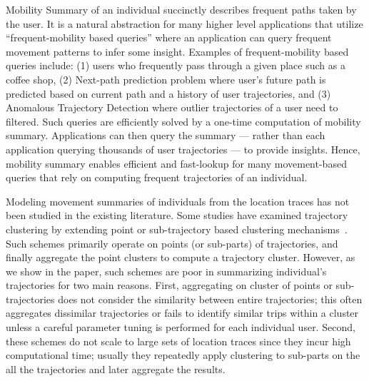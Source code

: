 Mobility Summary of an individual succinctly describes frequent paths taken by the user. It is a natural abstraction for many higher level applications that utilize ``frequent-mobility based queries'' where an application can query frequent movement patterns to infer some insight. Examples of frequent-mobility based queries include: (1) users who frequently pass through a given place such as a coffee shop, (2) Next-path prediction problem where user's future path is predicted based on current path and a history of user trajectories, and  (3) Anomalous Trajectory Detection where outlier trajectories of a user need to filtered. Such queries are efficiently solved by a one-time computation of mobility summary. Applications can then query the summary --- rather than each application querying thousands of user trajectories --- to provide insights. Hence, mobility summary enables efficient and fast-lookup for many movement-based queries that rely on computing frequent trajectories of an individual. 


Modeling movement summaries of individuals from the location traces has not been studied in the existing literature. Some studies have examined trajectory clustering by extending point or sub-trajectory based clustering mechanisms~\cite{Li2010,Lee2007}. Such schemes primarily operate on points (or sub-parts) of trajectories, and finally aggregate the point clusters to compute a trajectory cluster. However, as we show in the paper, such schemes are poor in summarizing individual's trajectories for two main reasons. First, aggregating on cluster of points or sub-trajectories does not consider the similarity between entire trajectories; this often aggregates dissimilar trajectories or fails to identify similar trips within a cluster unless a careful parameter tuning is performed for each individual user. Second, these schemes do not scale to large sets of location traces since they incur high computational time; usually they repeatedly apply clustering to sub-parts on the all the trajectories and later aggregate the results. 

